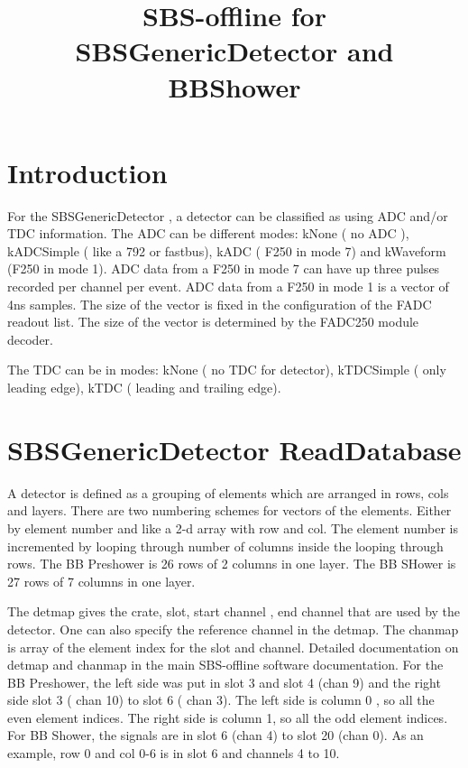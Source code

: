 \documentclass[11pt]{article}
\begin{document}
\title{SBS-offline for SBSGenericDetector  and BBShower}
\maketitle

\section{Introduction}
For the SBSGenericDetector , a detector can be classified as using ADC and/or TDC information.
The ADC can be different modes: kNone ( no ADC ), kADCSimple ( like a 792 or fastbus), kADC ( F250 in mode 7)
and kWaveform (F250 in mode 1). ADC data from a F250 in mode 7 can have up three pulses recorded
per channel per event. ADC data from a F250 in mode 1 is a vector of 4ns samples. The size of the vector is fixed in the configuration of the FADC readout list.  The size of the vector is determined by
the FADC250 module decoder. 


The TDC can be in modes: kNone ( no TDC for detector), kTDCSimple ( only leading edge), kTDC ( leading and trailing edge). 

\section{SBSGenericDetector ReadDatabase}
A detector is defined as a grouping of elements which are arranged in rows, cols and layers.
There are two numbering schemes for vectors of the elements.
Either by element number and like a 2-d array with row and col. 
The element number is incremented
by looping through  number of columns inside the looping through rows.
The BB Preshower is 26 rows of 2 columns in one layer.  The BB SHower is 27 rows of 7 columns in one 
layer.

The detmap gives the crate, slot, start channel , end channel that are used by the detector.
One can also specify the reference channel in the detmap.
The chanmap is array of the element index for the slot and channel.
Detailed documentation on detmap and chanmap in the main SBS-offline software documentation.
For the BB Preshower, the left side was put in slot 3 and slot 4 (chan 9)  and the right side slot 3 ( chan 10)
to slot 6 ( chan 3). The left side is column 0 , so all the even element indices. The right side is 
column 1, so all the odd element indices. 
For BB Shower, the signals are in slot 6 (chan 4) to slot 20 (chan 0). As an example, row 0 and col 0-6
is in slot 6 and channels 4 to 10.
\end{document}
